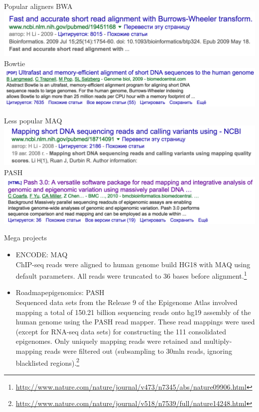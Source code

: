 \documentclass{beamer}
\begin{document}
\begin{frame}{Popular aligners}
BWA\\
\includegraphics[width=\linewidth]{bwa.png}\\
Bowtie\\
\includegraphics[width=\linewidth]{bowtie.png}\\
\end{frame}

\begin{frame}{Less popular}
MAQ\\
\includegraphics[width=\linewidth]{MAQ.png}\\
PASH\\
\includegraphics[width=\linewidth]{pash.png}\\
\end{frame}

\begin{frame}{Mega projects}
\begin{itemize}
\item ENCODE: MAQ\\
ChIP-seq reads were aligned to human genome build HG18 with MAQ using default parameters. All reads were truncated to 36 bases before alignment.\footnote{\url{http://www.nature.com/nature/journal/v473/n7345/abs/nature09906.html}}
\item Roadmapepigenomics: PASH\\
Sequenced data sets from the Release 9 of the Epigenome Atlas involved mapping a total of 150.21 billion sequencing reads onto hg19 assembly of the human genome using the PASH read mapper. These read mappings were used (except for RNA-seq data sets) for constructing the 111 consolidated epigenomes. Only uniquely mapping reads were retained and multiply-mapping reads were filtered out (subsampling to 30mln reads, ignoring blacklisted regions).\footnote{\url{http://www.nature.com/nature/journal/v518/n7539/full/nature14248.html}}
\end{itemize}
\end{frame}
\end{document}
